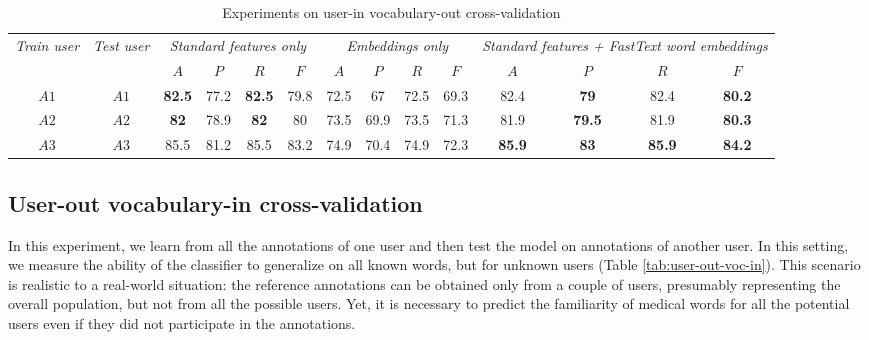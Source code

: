\begin{table*}[h]
\begin{tabular}{cc|cccc|cccc|cccc}
\multirow{2}{0.6cm}{\textit{Train user}} & \multirow{2}{0.6cm}{\textit{Test user}} & \multicolumn{4}{c|}{\textit{Standard features only}} & \multicolumn{4}{c|}{\textit{Embeddings only}} & \multicolumn{4}{X}{\textit{Standard features + FastText word embeddings}} \\ \cline{3-14} 
 &  & $A$ & $P$ & $R$ & $F$ & $A$ & $P$ & $R$ & $F$ & $A$ & $P$ & $R$ & $F$ \\ \hline
$A1$ & $A1$ & \textbf{82.5} & 77.2 & \textbf{82.5} & 79.8 & 72.5 & 67 & 72.5 & 69.3 & 82.4 & \textbf{79} & 82.4 & \textbf{80.2} \\
$A2$ & $A2$ & \textbf{82} & 78.9 & \textbf{82} & 80 & 73.5 & 69.9 & 73.5 & 71.3 & 81.9 & \textbf{79.5} & 81.9 & \textbf{80.3} \\ 
$A3$ & $A3$ & 85.5 & 81.2 & 85.5 & 83.2 & 74.9 & 70.4 & 74.9 & 72.3 & \textbf{85.9} & \textbf{83} & \textbf{85.9} & \textbf{84.2} \\ \hline 
\end{tabular}
    \caption{Experiments on user-in vocabulary-out cross-validation}
    \label{tab:user-in-voc-out}
\end{table*}


\subsection{User-out vocabulary-in cross-validation}

In this experiment, we learn from all the annotations of one user and then test the model on annotations of another user. In this setting, we measure the ability of the classifier to generalize on all known words, but for unknown users (Table \ref{tab:user-out-voc-in}). This scenario is realistic to a real-world situation: the reference annotations can be obtained only from a couple of users, presumably representing the overall population, but not from all the possible users. Yet, it is necessary to predict the familiarity of medical words for all the potential users even if they
did not participate in the annotations.

